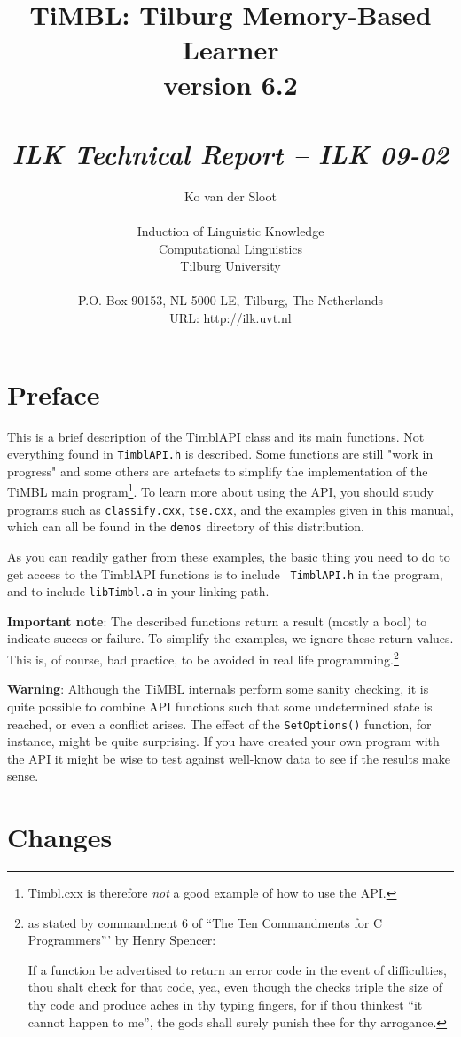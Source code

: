 \documentclass{report}
\author{Ko van der Sloot\\ \ \\ Induction of Linguistic Knowledge\\
        Computational Linguistics\\ Tilburg University \\ \ \\
        P.O. Box 90153, NL-5000 LE, Tilburg, The Netherlands \\ URL:
        http://ilk.uvt.nl}
\title{{\huge TiMBL: Tilburg Memory-Based Learner} \\ \vspace*{0.5cm}
{\bf version 6.2} \\ \vspace*{0.5cm}{\huge API Reference Guide}\\
\vspace*{1cm} {\it ILK Technical Report -- ILK 09-02}}
\begin{document}
\maketitle

\tableofcontents

\chapter*{Preface}

This is a brief description of the TimblAPI class and its main
functions.  Not everything found in {\tt TimblAPI.h} is
described. Some functions are still "work in progress" and some others
are artefacts to simplify the implementation of the TiMBL main
program\footnote{Timbl.cxx is therefore {\em not} a good example of
  how to use the API.}.  To learn more about using the API, you should
study programs such as {\tt classify.cxx}, {\tt tse.cxx}, and the
examples given in this manual, which can all be found in the {\tt demos}
directory of this distribution.

As you can readily gather from these examples, the basic thing you
need to do to get access to the TimblAPI functions is to include {\tt
  TimblAPI.h} in the program, and to include {\tt libTimbl.a} in your
linking path.

{\bf Important note}: The described functions return a result (mostly
a bool) to indicate succes or failure. To simplify the examples, we
ignore these return values. This is, of course, bad practice, to be avoided in
real life programming.\footnote{as stated by commandment 6 of ``The
  Ten Commandments for C Programmers''' by Henry Spencer:	

If a function be advertised to return an error code in the event of
difficulties, thou shalt check for that code, yea, even though the
checks triple the size of thy code and produce aches in thy typing
fingers, for if thou thinkest ``it cannot happen to me'', the gods
shall surely punish thee for thy arrogance.}

{\bf Warning}: Although the TiMBL internals perform some sanity
checking, it is quite possible to combine API functions such
that some undetermined state is reached, or even a conflict
arises. The effect of the {\tt SetOptions()} function, for instance,
might be quite surprising. If you have created your own program
with the API it might be wise to test against well-know data to see if
the results make sense.

\chapter{Changes}
\label{changes}
\end{document}

